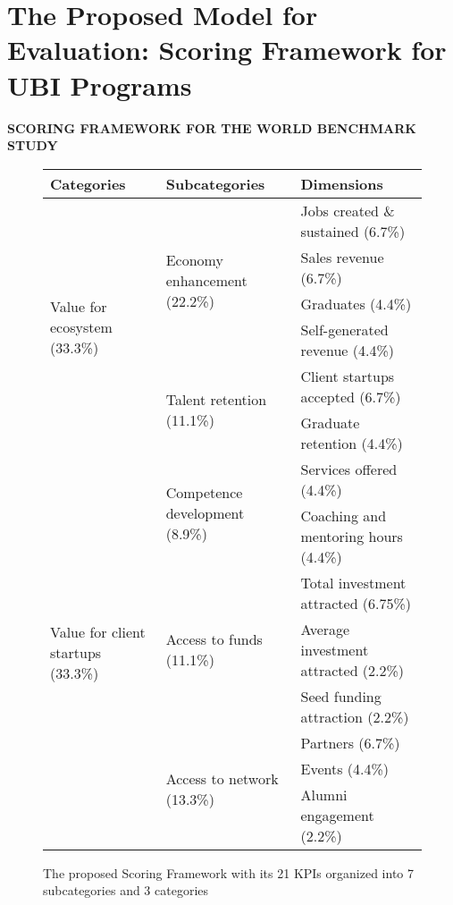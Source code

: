 \documentclass[../Main.tex]{subfiles}
\begin{document}
	\section{The Proposed  Model for Evaluation: Scoring Framework for UBI Programs}

	\def\arraystretch{1.2} %

\begin{center}
\textbf{SCORING FRAMEWORK FOR THE WORLD BENCHMARK STUDY \cite{Amin2024Incubators,ubi2021world,ubi2019world}}
\end{center}

\begin{figure}[H]
\centering
\caption{The proposed Scoring Framework with its 21 KPIs organized into 7 subcategories and 3 categories}
\label{tab:scoring_framework}
\begin{tabular}{|p{}|p{}|p{}|}
\hline
\textbf{Categories} & \textbf{Subcategories} & \textbf{Dimensions} \\
\hline
\multirow{6}{=}{Value for ecosystem (33.3\%)} & \multirow{4}{=}{Economy enhancement (22.2\%)} & Jobs created \& sustained (6.7\%) \\
\cline{3-3}
& & Sales revenue (6.7\%) \\
\cline{3-3}
& & Graduates (4.4\%) \\
\cline{3-3}
& & Self-generated revenue (4.4\%) \\
\cline{2-3}
& \multirow{2}{=}{Talent retention (11.1\%)} & Client startups accepted (6.7\%) \\
\cline{3-3}
& & Graduate retention (4.4\%) \\
\hline
\multirow{8}{=}{Value for client startups (33.3\%)} & \multirow{2}{=}{Competence development (8.9\%)} & Services offered (4.4\%) \\
\cline{3-3}
& & Coaching and mentoring hours (4.4\%) \\
\cline{2-3}
& \multirow{3}{=}{Access to funds (11.1\%)} & Total investment attracted (6.75\%) \\
\cline{3-3}
& & Average investment attracted (2.2\%) \\
\cline{3-3}
& & Seed funding attraction (2.2\%) \\
\cline{2-3}
& \multirow{3}{=}{Access to network (13.3\%)} & Partners (6.7\%) \\
\cline{3-3}
& & Events (4.4\%) \\
\cline{3-3}
& & Alumni engagement (2.2\%) \\

\end{tabular}
\end{figure}
\end{document}
